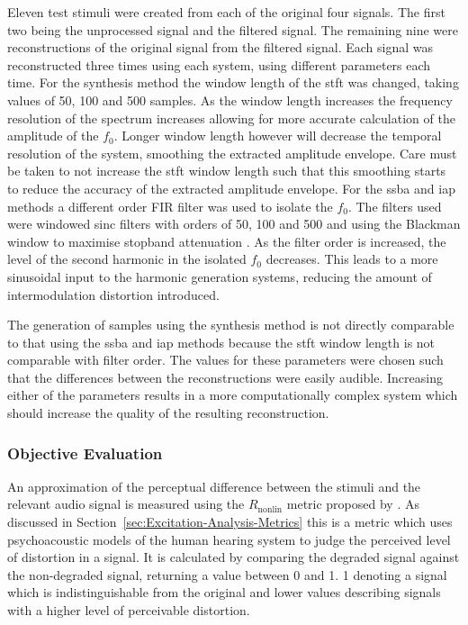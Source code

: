 			Eleven test stimuli were created from each of the original four signals. The first two being the
			unprocessed signal and the filtered signal. The remaining nine were reconstructions of the original
			signal from the filtered signal. Each signal was reconstructed three times using each system, using
			different parameters each time. For the synthesis method the window length of the \acrshort{stft}
			was changed, taking values of 50, 100 and 500 samples. As the window length increases the frequency
			resolution of the spectrum increases allowing for more accurate calculation of the amplitude of the
			$f_{0}$.  Longer window length however will decrease the temporal resolution of the system,
			smoothing the extracted amplitude envelope. Care must be taken to not increase the \acrshort{stft}
			window length such that this smoothing starts to reduce the accuracy of the extracted amplitude
			envelope.  For the \acrshort{ssba} and \acrshort{iap} methods a different order FIR filter was used
			to isolate the $f_{0}$. The filters used were windowed sinc filters with orders of 50, 100 and 500
			and using the Blackman window to maximise stopband attenuation \citep{schlichtharle2011digital}. As
			the filter order is increased, the level of the second harmonic in the isolated $f_{0}$ decreases.
			This leads to a more sinusoidal input to the harmonic generation systems, reducing the amount of
			intermodulation distortion introduced.

			The generation of samples using the synthesis method is not directly comparable to that using the
			\acrshort{ssba} and \acrshort{iap} methods because the \acrshort{stft} window length is not
			comparable with filter order.  The values for these parameters were chosen such that the
			differences between the reconstructions were easily audible. Increasing either of the parameters
			results in a more computationally complex system which should increase the quality of the resulting
			reconstruction.

		\subsubsection*{Objective Evaluation}
			An approximation of the perceptual difference between the stimuli and the relevant audio signal is
			measured using the $R_{\mathrm{nonlin}}$ metric proposed by \citet{tan2004predicting}. As discussed
			in Section~\ref{sec:Excitation-Analysis-Metrics} this is a metric which uses psychoacoustic models
			of the human hearing system to judge the perceived level of distortion in a signal. It is
			calculated by comparing the degraded signal against the non-degraded signal, returning a value
			between 0 and 1. 1 denoting a signal which is indistinguishable from the original and lower values
			describing signals with a higher level of perceivable distortion.

